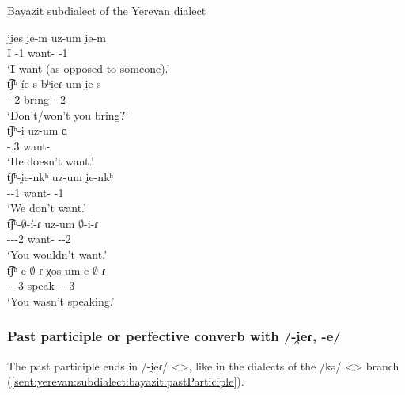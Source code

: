 \begin{exe}
	\ex Bayazit subdialect of the Yerevan dialect \label{sent:yerevan:subdialect:bayazit:auxRep}
	\begin{xlist}
		\ex \gll ji̯es i̯e-m uz-um i̯e-m \\
		I {\aux}-1{\sg} want-{\impfcvb} {\aux}-1{\sg} \\
		\trans `\textbf{I} want (as opposed to someone).'\\
		\ex \gll t͡ʃʰ-\'i̯e-s bʰi̯eɾ-um i̯e-s \\
		{\neggloss}-{\aux}-2{\sg} bring-{\impfcvb} {\aux}-2{\sg} \\
		\trans `Don't/won't you bring?' \\
		\ex \gll t͡ʃʰ-i uz-um ɑ \\
		{\neggloss}-{\aux}.3{\sg} want-{\impfcvb} {\aux} \\
		\trans `He doesn't want.' \\
		\ex \gll t͡ʃʰ-i̯e-nkʰ uz-um i̯e-nkʰ \\
		{\neggloss}-{\aux}-1{\pl} want-{\impfcvb} {\aux}-1{\pl} \\
		\trans `We don't want.' \\
		\ex \gll t͡ʃʰ-$\emptyset$-\'i-ɾ uz-um $\emptyset$-i-ɾ \\
		{\neggloss}-{\aux}-{\pst}-2{\sg} want-{\impfcvb} {\aux}-{\pst}-2{\sg} \\
		\trans `You wouldn't want.' \\
		\ex \gll t͡ʃʰ-e-$\emptyset$-ɾ χos-um e-$\emptyset$-ɾ\\
		{\neggloss}-{\aux}-{\pst}-3{\sg} speak-{\impfcvb} {\aux}-{\pst}-3{\sg} \\
		\trans `You wasn't speaking.' \\
	\end{xlist}
\end{exe}


\subsubsection{Past participle or perfective converb with /-i̯eɾ, -e/} 

The past participle ends in /-i̯eɾ/ <>, like in the dialects of the /kə/ <> branch (\ref{sent:yerevan:subdialect:bayazit:pastParticiple}).

